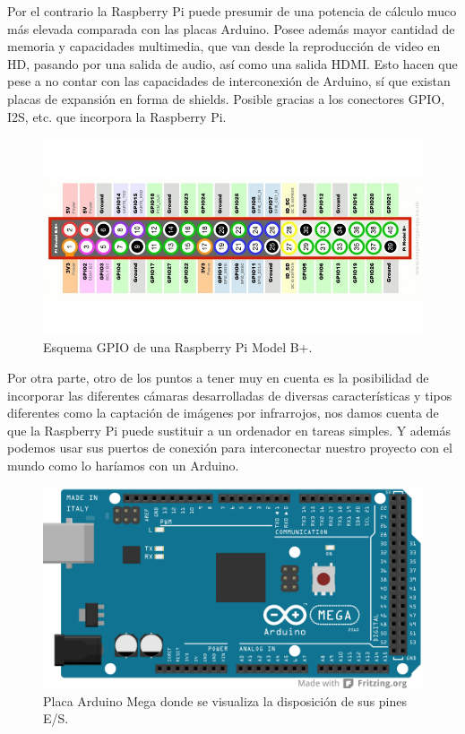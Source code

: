 Por el contrario la Raspberry Pi puede presumir de una potencia de cálculo muco más elevada comparada con las placas Arduino. Posee además mayor cantidad de memoria y capacidades
multimedia, que van desde la reproducción de video en HD, pasando por una salida de audio, así como una salida HDMI. Esto hacen que pese a no contar con las capacidades de
interconexión de Arduino, sí que existan placas de expansión en forma de shields. Posible gracias a los conectores GPIO, I2S, etc. que incorpora la Raspberry Pi.\\

\begin{figure}[H]
  \begin{center}
    \includegraphics[scale=0.4]{imagenes/robot/gpio-conexiones.jpg}
  \end{center}
  \caption{Esquema GPIO de una Raspberry Pi Model B+.}
  \label{gantt:tareas01}
\end{figure}

Por otra parte, otro de los puntos a tener muy en cuenta es la posibilidad de incorporar las diferentes cámaras desarrolladas de diversas características y tipos diferentes como
la captación de imágenes por infrarrojos, nos damos cuenta de que la Raspberry Pi puede sustituir a un ordenador en tareas simples. Y además podemos usar sus puertos de conexión
para interconectar nuestro proyecto con el mundo como lo haríamos con un Arduino.\\

\begin{figure}[H]
  \begin{center}
    \includegraphics[scale=0.4]{imagenes/arduino_mega_pinout.png}
  \end{center}
  \caption{Placa Arduino Mega donde se visualiza la disposición de sus pines E/S.}
  \label{gantt:tareas01}
\end{figure}


